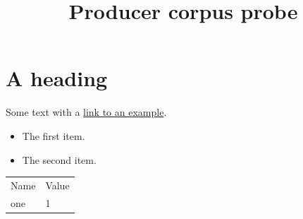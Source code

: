 \documentclass{article}
\title{Producer corpus probe}
\begin{document}
\maketitle
\section{A heading}
Some text with a \href{https://example.org/}{link to an example}.
\begin{itemize}\item The first item.\item The second item.\end{itemize}
\begin{tabular}{ll}Name&Value\\one&1\end{tabular}
\end{document}
